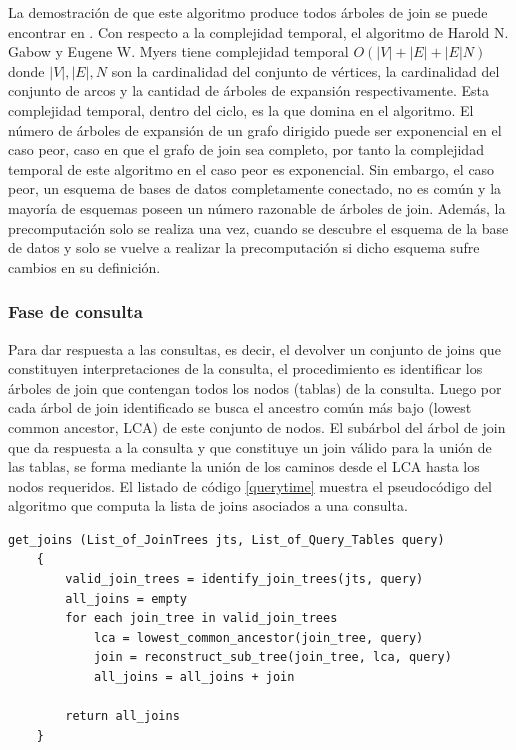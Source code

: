La demostración de que este algoritmo produce todos \'arboles de join se puede encontrar en 
\cite{mason2005autojoin}. Con respecto a la complejidad temporal, el algoritmo de Harold N. Gabow y 
Eugene W. Myers tiene complejidad temporal $O(|V| + |E| + |E|N)$ donde $|V|, |E|, N$ son la cardinalidad 
del conjunto de vértices, la cardinalidad del conjunto de arcos y la cantidad de \'arboles de expansión respectivamente. 
Esta complejidad temporal, dentro del ciclo, es la que domina en el algoritmo. El n\'umero de \'arboles de 
expansión de un grafo dirigido puede ser exponencial en el caso peor, caso en que el grafo de join sea 
completo, por tanto la complejidad temporal de este algoritmo en el caso peor es exponencial. Sin embargo, 
el caso peor, un esquema de bases de datos completamente conectado, no es com\'un y la mayoría de esquemas 
poseen un n\'umero razonable de \'arboles de join. Además, la precomputaci\'on solo se realiza una vez, 
cuando se descubre el esquema de la base de datos y solo se vuelve a realizar la precomputaci\'on si dicho 
esquema sufre cambios en su definición.

\subsubsection{Fase de consulta}

Para dar respuesta a las consultas, es decir, el devolver un conjunto de joins que constituyen 
interpretaciones de la consulta, el procedimiento es identificar los \'arboles de join que 
contengan todos los nodos (tablas) de la consulta. Luego por cada \'arbol de join identificado 
se busca el ancestro com\'un m\'as bajo (lowest common ancestor, LCA) de este conjunto de nodos. 
El sub\'arbol del \'arbol de join que da respuesta a la consulta y que constituye un join válido 
para la uni\'on de las tablas, se forma mediante la uni\'on de los caminos desde 
el LCA hasta los nodos requeridos. El listado de código \ref{querytime} muestra el pseudoc\'odigo 
del algoritmo que computa la lista de joins asociados a una consulta.

\begin{lstlisting}[label={querytime}, caption={Pseudoc\'odigo del algoritmo de inferencia de joins}]
    get_joins (List_of_JoinTrees jts, List_of_Query_Tables query)
    {
        valid_join_trees = identify_join_trees(jts, query)
        all_joins = empty
        for each join_tree in valid_join_trees
            lca = lowest_common_ancestor(join_tree, query)
            join = reconstruct_sub_tree(join_tree, lca, query)
            all_joins = all_joins + join

        return all_joins
    }
\end{lstlisting}

